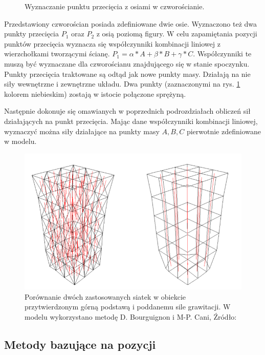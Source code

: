 \begin{figure}[ht]
\centering

\caption{Wyznaczanie punktu przecięcia z osiami w czworościanie.}
\label{anizotropia-czworoscian}
\end{figure}

Przedstawiony czworościan posiada zdefiniowane dwie osie. Wyznaczono też dwa punkty przecięcia $P_1$ oraz $P_2$ z osią poziomą figury. W celu zapamiętania pozycji punktów przecięcia wyznacza się współczynniki kombinacji liniowej z wierzchołkami tworzącymi ścianę. $P_1 = \alpha * A + \beta *B + \gamma *C$. Współczynniki te muszą być wyznaczane dla czworościanu znajdującego się w stanie spoczynku. Punkty przecięcia traktowane są odtąd jak nowe punkty masy. Działają na nie siły wewnętrzne i zewnętrzne układu. Dwa punkty (zaznaczonymi na rys. \ref{anizotropia-czworoscian} kolorem niebieskim) zostają w istocie połączone sprężyną.

Następnie dokonuje się omawianych w poprzednich podrozdziałach obliczeń sił działających na punkt przecięcia. Mając dane współczynniki kombinacji liniowej, wyznaczyć można siły działające na punkty masy $A,B,C$ pierwotnie zdefiniowane w modelu. 

\begin{figure}[ht]
\centering
\includegraphics[scale=0.5]{images/fixed_anisotropy.png}
\caption{Porównanie dwóch zastosowanych siatek w obiekcie przytwierdzonym górną podstawą i poddanemu sile grawitacji. W modelu wykorzystano metodę D. Bourguignon i M-P. Cani, Źródło: \cite{ca}}
\label{anizotropia-czworoscian-fix}
\end{figure}

\subsection{Metody bazujące na pozycji}
